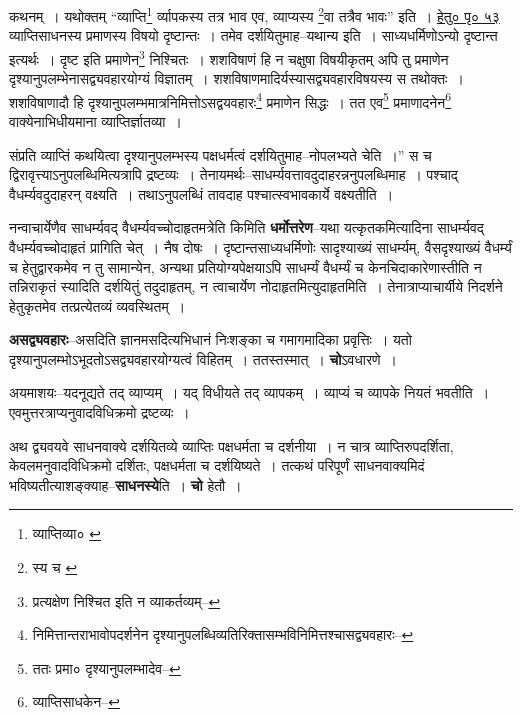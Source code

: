 \documentclass[article,12pt,a4paper]{memoir}
\begin{document}
	कथनम् । यथोक्तम् “व्याप्ति\footnote{व्याप्तिव्या० \cite{dp-msA}} र्व्यापकस्य तत्र भाव एव, व्याप्यस्य \footnote{स्य च \cite{dp-msB} \cite{dp-msC} \cite{dp-msD} \cite{dp-edP} \cite{dp-edH} \cite{dp-edE} \cite{dp-edN}}वा तत्रैव भावः” इति । \href{http://http://sarit.indology.info/?cref=hb.1.4}{हेतु० पृ० ५३} व्याप्तिसाधनस्य प्रमाणस्य विषयो दृष्टान्तः । तमेव दर्शयितुमाह--यथान्य इति । साध्यधर्मिणोऽन्यो दृष्टान्त इत्यर्थः । दृष्ट इति प्रमाणेन\footnote{प्रत्यक्षेण निश्चित इति न व्याकर्तव्यम्--\cite{dp-msD-n}} निश्चितः । शशविषाणं हि न चक्षुषा विषयीकृतम् अपि तु प्रमाणेन दृश्यानुपलम्भेनासद्व्यवहारयोग्यं विज्ञातम् । शशविषाणमादिर्यस्यासद्व्यवहारविषयस्य स तथोक्तः । शशविषाणादौ हि दृश्यानुपलम्भमात्रनिमित्तोऽसद्वयवहारः\footnote{निमित्तान्तराभावोपदर्शनेन दृश्यानुपलब्धिव्यतिरिक्तासम्भविनिमित्तश्चासद्व्यवहारः--\cite{dp-msD-n}} प्रमाणेन सिद्धः । तत एव\footnote{ततः प्रमा० \cite{dp-msC} दृश्यानुपलम्भादेव--\cite{dp-msD-n}} प्रमाणादनेन\footnote{व्याप्तिसाधकेन--\cite{dp-msD-n}} वाक्येनाभिधीयमाना व्याप्तिर्ज्ञातव्या । 
	  
	संप्रति व्याप्तिं कथयित्वा दृश्यानुपलम्भस्य पक्षधर्मत्वं दर्शयितुमाह--नोपलभ्यते चेति ।” स च द्विरावृत्त्याऽनुपलब्धिमित्यत्रापि द्रष्टव्यः । तेनायमर्थः--साधर्म्यवत्तावदुदाहरन्ननुपलब्धिमाह । पश्चाद् वैधर्म्यवदुदाहरन् वक्ष्यति । तथाऽनुपलब्धिं तावदाह पश्चात्स्वभावकार्ये वक्ष्यतीति ।
	\pend
      

	  \pstart नन्वाचार्येणैव साधर्म्यवद् वैधर्म्यवच्चोदाहृतमत्रेति किमिति \textbf{धर्मोत्तरेण}--यथा यत्कृतकमित्यादिना साधर्म्यवद् वैधर्म्यवच्चोदाहृतं प्रागिति चेत् । नैष दोषः । दृष्टान्तसाध्यधर्मिणोः सादृश्याख्यं साधर्म्यम्, वैसदृश्याख्यं वैधर्म्यं च हेतुद्वारकमेव न तु सामान्येन, अन्यथा प्रतियोग्यपेक्षयाऽपि साधर्म्यं वैधर्म्यं च केनचिदाकारेणास्तीति न तन्निराकृतं स्यादिति दर्शयितुं तदुदाहृतम्, न त्वाचार्येण नोदाहृतमित्युदाहृतमिति । तेनात्राप्याचार्यीये निदर्शने हेतुकृतमेव तत्प्रत्येतव्यं व्यवस्थितम् ।
	\pend
      

	  \pstart \textbf{असद्व्यवहारः}--असदिति ज्ञानमसदित्यभिधानं निःशङ्का च गमागमादिका प्रवृत्तिः । यतो दृश्यानुपलम्भोऽभूदतोऽसद्व्यवहारयोग्यत्वं विहितम् । ततस्तस्मात् । \textbf{चो}ऽवधारणे ।
	\pend
      

	  \pstart अयमाशयः--यदनूद्यते तद् व्याप्यम् । यद् विधीयते तद् व्यापकम् । व्याप्यं च व्यापके नियतं भवतीति । एवमुत्तरत्राप्यनुवादविधिक्रमो द्रष्टव्यः ।
	\pend
      

	  \pstart अथ द्व्यवयवे साधनवाक्ये दर्शयितव्ये व्याप्तिः पक्षधर्मता च दर्शनीया । न चात्र व्याप्तिरुपदर्शिता, केवलमनुवादविधिक्रमो दर्शितः, पक्षधर्मता च दर्शयिष्यते । तत्कथं परिपूर्णं साधनवाक्यमिदं भविष्यतीत्याशङ्क्याह--\textbf{साधनस्ये}ति । \textbf{चो} हेतौ ।
	\pend
      
\end{document}
